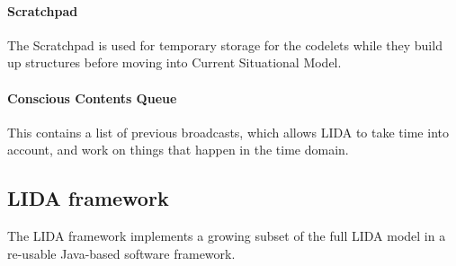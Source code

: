 \paragraph{Scratchpad} The Scratchpad is used for temporary storage for the
codelets while they build up structures before moving into Current Situational
Model.
\paragraph{Conscious Contents Queue}
This contains a list of previous broadcasts, which allows LIDA to take time
into account, and work on things that happen in the time domain.

\subsection{LIDA framework}
The LIDA framework implements a growing subset of the full LIDA model in a re-usable Java-based software framework.